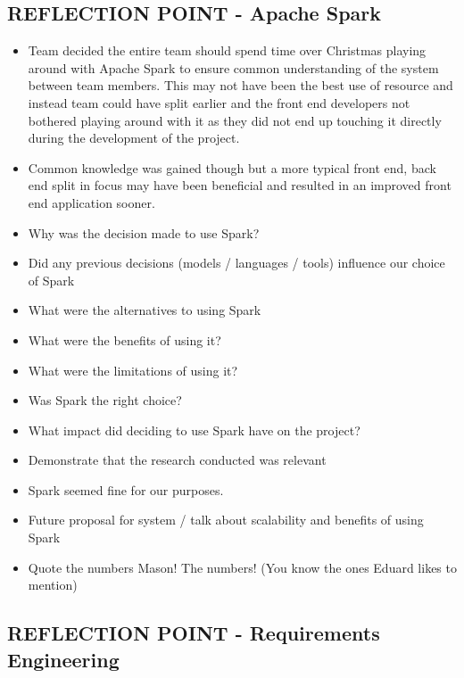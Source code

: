 \documentclass{l3proj}
\begin{document}
\subsection{REFLECTION POINT - Apache Spark}
\label{sec:sparkreflection}

\begin{itemize}
\item Team decided the entire team should spend time over Christmas playing around with Apache Spark to ensure common understanding of the system between team members. This may not have been the best use of resource and instead team could have split earlier and the front end developers not bothered playing around with it as they did not end up touching it directly during the development of the project. 
\item Common knowledge was gained though but a more typical front end, back end split in focus may have been beneficial and resulted in an improved front end application sooner.
\item Why was the decision made to use Spark?
\item Did any previous decisions (models / languages / tools) influence our choice of Spark
\item What were the alternatives to using Spark
\item What were the benefits of using it?
\item What were the limitations of using it?
\item Was Spark the right choice?
\item What impact did deciding to use Spark have on the project?
\item Demonstrate that the research conducted was relevant
\item Spark seemed fine for our purposes.
\item Future proposal for system / talk about scalability and benefits of using Spark
\item Quote the numbers Mason! The numbers! (You know the ones Eduard likes to mention)
\end{itemize}


\subsection{REFLECTION POINT - Requirements Engineering}
\label{sec:teamstructure}
\end{document}
